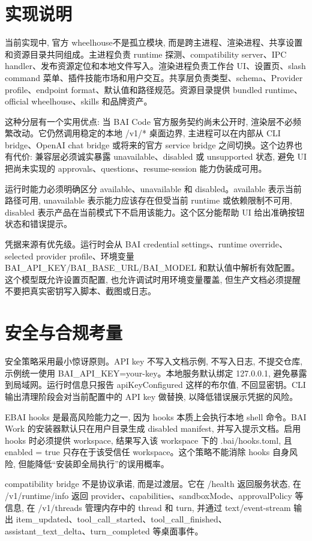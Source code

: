 \section{实现说明}
当前实现中, 官方 wheelhouse不是孤立模块, 而是跨主进程、渲染进程、共享设置和资源目录共同组成。主进程负责 runtime 探测、compatibility server、IPC handler、发布资源定位和本地文件写入。渲染进程负责工作台 UI、设置页、slash command 菜单、插件技能市场和用户交互。共享层负责类型、schema、Provider profile、endpoint format、默认值和路径规范。资源目录提供 bundled runtime、official wheelhouse、skills 和品牌资产。

这种分层有一个实用优点: 当 BAI Code 官方服务契约尚未公开时, 渲染层不必频繁改动。它仍然调用稳定的本地 /v1/* 桌面边界, 主进程可以在内部从 CLI bridge、OpenAI chat bridge 或将来的官方 service bridge 之间切换。这个边界也有代价: 兼容层必须诚实暴露 unavailable、disabled 或 unsupported 状态, 避免 UI 把尚未实现的 approvals、questions、resume-session 能力伪装成可用。

运行时能力必须明确区分 available、unavailable 和 disabled。available 表示当前路径可用, unavailable 表示能力应该存在但受当前 runtime 或依赖限制不可用, disabled 表示产品在当前模式下不启用该能力。这个区分能帮助 UI 给出准确按钮状态和错误提示。

凭据来源有优先级。运行时会从 BAI credential settings、runtime override、selected provider profile、环境变量 BAI\_API\_KEY/BAI\_BASE\_URL/BAI\_MODEL 和默认值中解析有效配置。这个模型既允许设置页配置, 也允许调试时用环境变量覆盖, 但生产文档必须提醒不要把真实密钥写入脚本、截图或日志。

\section{安全与合规考量}
安全策略采用最小惊讶原则。API key 不写入文档示例, 不写入日志, 不提交仓库, 示例统一使用 BAI\_API\_KEY=your-key。本地服务默认绑定 127.0.0.1, 避免暴露到局域网。运行时信息只报告 apiKeyConfigured 这样的布尔值, 不回显密钥。CLI 输出清理阶段会对当前配置中的 API key 做替换, 以降低错误展示凭据的风险。

EBAI hooks 是最高风险能力之一, 因为 hooks 本质上会执行本地 shell 命令。BAI Work 的安装器默认只在用户目录生成 disabled manifest, 并写入提示文档。启用 hooks 时必须提供 workspace, 结果写入该 workspace 下的 .bai/hooks.toml, 且 enabled = true 只存在于该受信任 workspace。这个策略不能消除 hooks 自身风险, 但能降低“安装即全局执行”的误用概率。

compatibility bridge 不是协议承诺, 而是过渡层。它在 /health 返回服务状态, 在 /v1/runtime/info 返回 provider、capabilities、sandboxMode、approvalPolicy 等信息, 在 /v1/threads 管理内存中的 thread 和 turn, 并通过 text/event-stream 输出 item\_updated、tool\_call\_started、tool\_call\_finished、assistant\_text\_delta、turn\_completed 等桌面事件。

